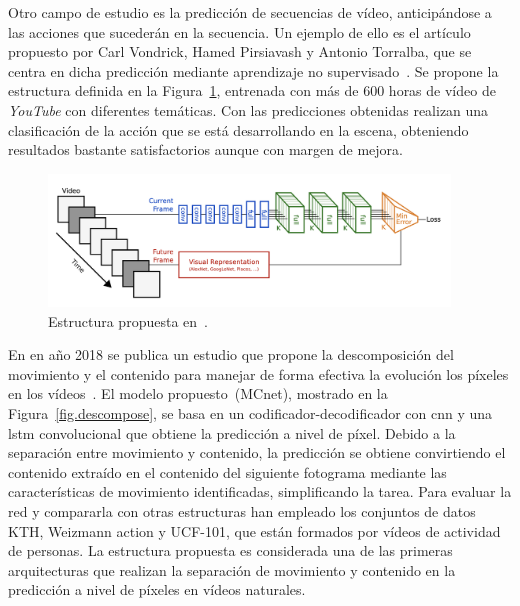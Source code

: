 Otro campo de estudio es la predicción de secuencias de vídeo, anticipándose a las acciones que sucederán en la secuencia. Un ejemplo de ello es el artículo propuesto por Carl Vondrick, Hamed  Pirsiavash y Antonio Torralba, que se centra en dicha predicción mediante aprendizaje no supervisado~\cite{unlabeledvideo}. Se propone la estructura definida en la Figura~\ref{fig.unlabeled_net}, entrenada con más de 600 horas de vídeo de \textit{YouTube} con diferentes temáticas. Con las predicciones obtenidas realizan una clasificación de la acción que se está desarrollando en la escena, obteniendo resultados bastante satisfactorios aunque con margen de mejora.

\vspace{10pt}
\begin{figure}[H]
	\begin{center}
		\includegraphics[width=0.95\textwidth]{ figures/estadoarte/unlabeled_net.png}
		\caption{Estructura propuesta en~\cite{unlabeledvideo}.
		}
		\label{fig.unlabeled_net}
	\end{center}
\end{figure}
\vspace{-10pt}

En en año 2018 se publica un estudio que propone la descomposición del movimiento y el contenido para manejar de forma efectiva la evolución los píxeles en los vídeos~\cite{descompose}. El modelo propuesto~(MCnet), mostrado en la Figura~\ref{fig.descompose}, se basa en un codificador-decodificador con \acrshort{cnn} y una \acrshort{lstm} convolucional que obtiene la predicción a nivel de píxel. Debido a la separación entre movimiento y contenido, la predicción se obtiene convirtiendo el contenido extraído en el contenido del siguiente fotograma mediante las características de movimiento identificadas, simplificando la tarea. Para evaluar la red y compararla con otras estructuras han empleado los conjuntos de datos KTH, Weizmann action y UCF-101, que están formados por vídeos de actividad de personas. La estructura propuesta es considerada una de las primeras arquitecturas que realizan la separación de movimiento y contenido en la predicción a nivel de píxeles en vídeos naturales.\\

